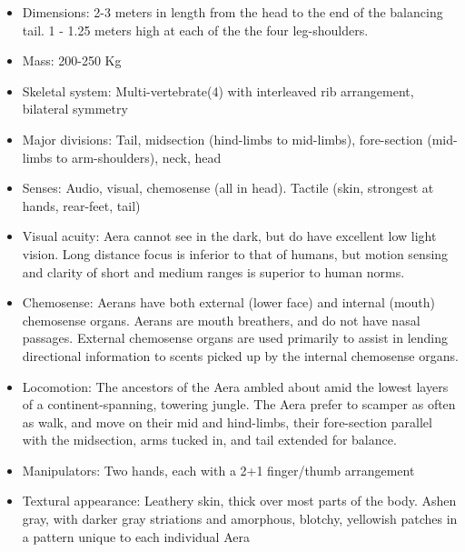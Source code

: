\begin{itemize}
\item Dimensions: 2-3 meters in length from the head to the end of the balancing tail. 1 - 1.25 meters high at each of the the four leg-shoulders.

\item Mass: 200-250 Kg

\item Skeletal system: Multi-vertebrate(4) with interleaved rib arrangement, bilateral symmetry

\item Major divisions: Tail, midsection (hind-limbs to mid-limbs), fore-section (mid-limbs to arm-shoulders), neck, head

\item Senses: Audio, visual, chemosense (all in head). Tactile (skin, strongest at hands, rear-feet, tail)

\item Visual acuity: Aera cannot see in the dark, but do have excellent low light vision. Long distance focus is inferior to that of humans, but motion sensing and clarity of short and medium ranges is superior to human norms. 

\item Chemosense: Aerans have both external (lower face) and internal (mouth) chemosense organs. Aerans are mouth breathers, and do not have nasal passages. External chemosense organs are used primarily to assist in lending directional information to scents picked up by the internal chemosense organs. 

\item Locomotion: The ancestors of the Aera ambled about amid the lowest layers of a continent-spanning, towering jungle. The Aera prefer to scamper as often as walk, and move on their mid and hind-limbs, their fore-section parallel with the midsection, arms tucked in, and tail extended for balance.

\item Manipulators: Two hands, each with a 2+1 finger/thumb arrangement

\item Textural appearance: Leathery skin, thick over most parts of the body. Ashen gray, with darker gray striations and amorphous, blotchy, yellowish patches in a pattern unique to each individual Aera
\end{itemize}

